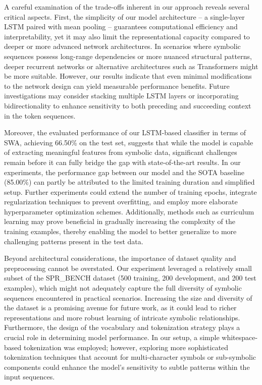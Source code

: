 \documentclass{article}
\begin{document}
A careful examination of the trade-offs inherent in our approach reveals several critical aspects. First, the simplicity of our model architecture – a single-layer LSTM paired with mean pooling – guarantees computational efficiency and interpretability, yet it may also limit the representational capacity compared to deeper or more advanced network architectures. In scenarios where symbolic sequences possess long-range dependencies or more nuanced structural patterns, deeper recurrent networks or alternative architectures such as Transformers might be more suitable. However, our results indicate that even minimal modifications to the network design can yield measurable performance benefits. Future investigations may consider stacking multiple LSTM layers or incorporating bidirectionality to enhance sensitivity to both preceding and succeeding context in the token sequences.

Moreover, the evaluated performance of our LSTM-based classifier in terms of SWA, achieving 66.50\% on the test set, suggests that while the model is capable of extracting meaningful features from symbolic data, significant challenges remain before it can fully bridge the gap with state-of-the-art results. In our experiments, the performance gap between our model and the SOTA baseline (85.00\%) can partly be attributed to the limited training duration and simplified setup. Further experiments could extend the number of training epochs, integrate regularization techniques to prevent overfitting, and employ more elaborate hyperparameter optimization schemes. Additionally, methods such as curriculum learning may prove beneficial in gradually increasing the complexity of the training examples, thereby enabling the model to better generalize to more challenging patterns present in the test data.

Beyond architectural considerations, the importance of dataset quality and preprocessing cannot be overstated. Our experiment leveraged a relatively small subset of the SPR\_BENCH dataset (500 training, 200 development, and 200 test examples), which might not adequately capture the full diversity of symbolic sequences encountered in practical scenarios. Increasing the size and diversity of the dataset is a promising avenue for future work, as it could lead to richer representations and more robust learning of intricate symbolic relationships. Furthermore, the design of the vocabulary and tokenization strategy plays a crucial role in determining model performance. In our setup, a simple whitespace-based tokenization was employed; however, exploring more sophisticated tokenization techniques that account for multi-character symbols or sub-symbolic components could enhance the model's sensitivity to subtle patterns within the input sequences.
\end{document}
